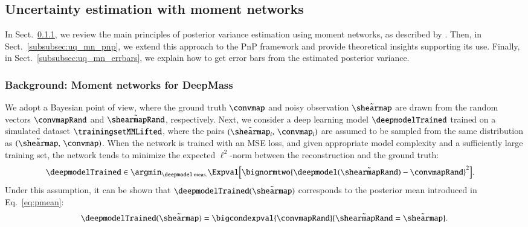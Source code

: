\documentclass{aa}
\begin{document}
\subsection{Uncertainty estimation with moment networks}
\label{subsec:uq_mn}

In Sect.~\ref{subsubsec:uq_mn_deepmass}, we review the main principles of posterior variance estimation using moment networks, as described by \citet{Jeffrey2020a}. Then, in Sect.~\ref{subsubsec:uq_mn_pnp}, we extend this approach to the PnP framework and provide theoretical insights supporting its use. Finally, in Sect.~\ref{subsubsec:uq_mn_errbars}, we explain how to get error bars from the estimated posterior variance.

\subsubsection{Background: Moment networks for DeepMass}
\label{subsubsec:uq_mn_deepmass}

We adopt a Bayesian point of view, where the ground truth $\convmap$ and noisy observation $\tilde\shearmap$ are drawn from the random vectors $\convmapRand$ and $\tilde\shearmapRand$, respectively.
Next, we consider a deep learning model $\deepmodelTrained$ trained on a simulated dataset $\trainingsetMMLifted$, where the pairs $(\tilde\shearmap_i,\, \convmap_i)$ are assumed to be sampled from the same distribution as $(\tilde\shearmap,\, \convmap)$. When the network is trained with an MSE loss, and given appropriate model complexity and a sufficiently large training set, the network tends to minimize the expected $\ell^2$-norm between the reconstruction and the ground truth:
\begin{align}
    \deepmodelTrained
        &\in \argmin_{\deepmodel \, \text{meas.}} \Expval\Bigl[\bignormtwo{
            \deepmodel(\tilde\shearmapRand) - \convmapRand
        }^2\Bigr].
\label{eq:minmse}
\end{align}
Under this assumption, it can be shown that $\deepmodelTrained(\tilde\shearmap)$ corresponds to the posterior mean introduced in Eq.~\eqref{eq:pmean}:
\begin{equation}
    \deepmodelTrained(\tilde\shearmap) = \bigcondexpval{\convmapRand}{\tilde\shearmapRand=\tilde\shearmap}.
\label{eq:approx_pmean}
\end{equation}
\end{document}
